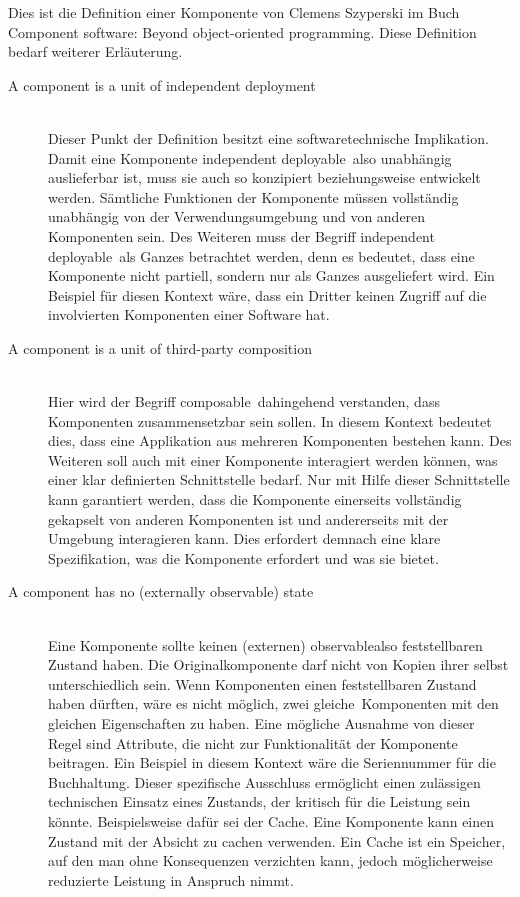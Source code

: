 Dies ist die Definition einer Komponente von Clemens Szyperski im Buch \glqq Component software: Beyond object-oriented programming\grqq \citereset \autocite{Szyperski.2002}.
Diese Definition bedarf weiterer Erläuterung.
\begin{description}
\item[A component is a unit of independent deployment] \hfill \\
Dieser Punkt der Definition besitzt eine softwaretechnische Implikation. Damit eine Komponente \glqq independent deployable\grqq\ also unabhängig auslieferbar ist, muss sie auch so konzipiert beziehungsweise entwickelt werden. Sämtliche Funktionen der Komponente müssen vollständig unabhängig von der Verwendungsumgebung und von anderen Komponenten sein. Des Weiteren muss der Begriff \glqq independent deployable\grqq\ als Ganzes betrachtet werden, denn es bedeutet, dass eine Komponente nicht partiell, sondern nur als Ganzes ausgeliefert wird. Ein Beispiel für diesen Kontext wäre, dass ein Dritter keinen Zugriff auf die involvierten Komponenten einer Software hat.\\
\item[A component is a unit of third-party composition] \hfill \\
Hier wird der Begriff \glqq composable\grqq\ dahingehend verstanden, dass Komponenten zusammensetzbar sein sollen. In diesem Kontext bedeutet dies, dass eine Applikation aus mehreren Komponenten bestehen kann. Des Weiteren soll auch mit einer Komponente interagiert werden können, was einer klar definierten Schnittstelle bedarf. Nur mit Hilfe dieser Schnittstelle kann garantiert werden, dass die Komponente einerseits vollständig gekapselt von anderen Komponenten ist und andererseits mit der Umgebung interagieren kann. Dies erfordert demnach eine klare Spezifikation, was die Komponente erfordert und was sie bietet.
\item[A component has no (externally observable) state] \hfill \\
Eine Komponente sollte keinen (externen) \glqq observable\grqq also feststellbaren Zustand haben. Die Originalkomponente darf nicht von Kopien ihrer selbst unterschiedlich sein. Wenn Komponenten einen feststellbaren Zustand haben dürften, wäre es nicht möglich, zwei \glqq gleiche\grqq\ Komponenten mit den gleichen Eigenschaften zu haben. Eine mögliche Ausnahme von dieser Regel sind Attribute, die nicht zur Funktionalität der Komponente beitragen. Ein Beispiel in diesem Kontext wäre die Seriennummer für die Buchhaltung. Dieser spezifische Ausschluss ermöglicht einen zulässigen technischen Einsatz eines Zustands, der kritisch für die Leistung sein könnte. Beispielsweise dafür sei der Cache. Eine Komponente kann einen Zustand mit der Absicht zu cachen verwenden. Ein Cache ist ein Speicher, auf den man ohne Konsequenzen verzichten kann, jedoch möglicherweise reduzierte Leistung in Anspruch nimmt.
\end{description}

